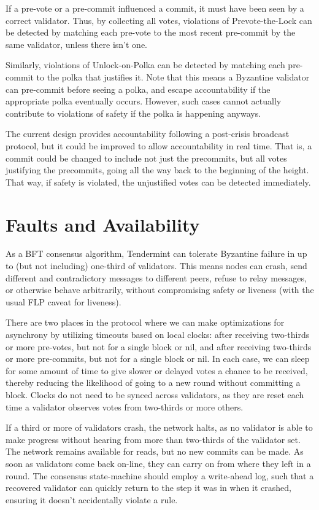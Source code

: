 If a pre-vote or a pre-commit influenced a commit, it must have been seen by a correct validator.
Thus, by collecting all votes, violations of Prevote-the-Lock can be detected
by matching each pre-vote to the most recent pre-commit by the same validator, unless there isn't one.

Similarly, violations of Unlock-on-Polka can be detected by matching each pre-commit
to the polka that justifies it. 
Note that this means a Byzantine validator can pre-commit before seeing a polka,
and escape accountability if the appropriate polka eventually occurs.
However, such cases cannot actually contribute to violations of safety 
if the polka is happening anyways.

The current design provides accountability following a post-crisis broadcast protocol,
but it could be improved to allow accountability in real time. 
That is, a commit could be changed to include not just the precommits, but all votes 
justifying the precommits, going all the way back to the beginning of the height.
That way, if safety is violated, the unjustified votes can be detected immediately.

\section{Faults and Availability}

As a BFT consensus algorithm, Tendermint can tolerate Byzantine failure in up to 
(but not including) one-third of validators.
This means nodes can crash, send different and contradictory messages to different peers, 
refuse to relay messages, or otherwise behave arbitrarily,
without compromising safety or liveness (with the usual FLP caveat for liveness).

There are two places in the protocol where we can make optimizations 
for asynchrony by utilizing timeouts based on local clocks:
after receiving two-thirds or more pre-votes, but not for a single block or nil, 
and after receiving two-thirds or more pre-commits, 
but not for a single block or nil.
In each case, we can sleep for some amount of time to give slower or delayed votes a chance to be received,
thereby reducing the likelihood of going to a new round without committing a block.
Clocks do not need to be synced across validators, 
as they are reset each time a validator observes votes from two-thirds or more others.

If a third or more of validators crash, the network halts, 
as no validator is able to make progress without hearing from more than two-thirds of the validator set.
The network remains available for reads, but no new commits can be made.
As soon as validators come back on-line, they can carry on from where they left in a round. 
The consensus state-machine should employ a write-ahead log,
such that a recovered validator can quickly return to the step it was in when it crashed,
ensuring it doesn't accidentally violate a rule.

